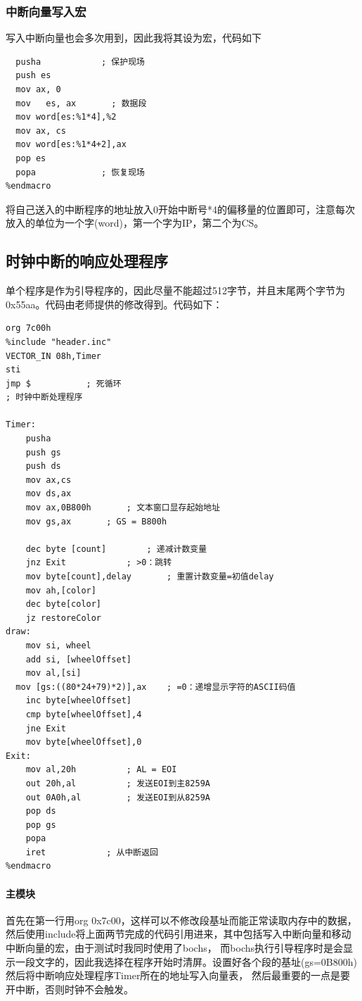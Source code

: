\documentclass[a4paper, 11pt]{article} %
\begin{document}
\subsubsection{中断向量写入宏}
写入中断向量也会多次用到，因此我将其设为宏，代码如下
\begin{lstlisting}[language={[x86masm]Ass
embler},label=VECTOR IN,caption=VECTOR\_IN]
  %macro VECTOR_IN 2
  pusha            ; 保护现场
  push es
  mov ax, 0
  mov	es, ax       ; 数据段
  mov word[es:%1*4],%2
  mov ax, cs
  mov word[es:%1*4+2],ax
  pop es
  popa             ; 恢复现场
%endmacro
\end{lstlisting}
将自己送入的中断程序的地址放入0开始中断号*4的偏移量的位置即可，注意每次放入的单位为一个字(word)，第一个字为IP，第二个为CS。

\subsection{时钟中断的响应处理程序}
单个程序是作为引导程序的，因此尽量不能超过512字节，并且末尾两个字节为0x55aa。代码由老师提供的修改得到。代码如下：
\begin{lstlisting}[language={[x86masm]Assembler},label=TimerTest,caption=Timer(test)]
org 7c00h
%include "header.inc"
VECTOR_IN 08h,Timer
sti
jmp $			; 死循环
; 时钟中断处理程序

Timer:
    pusha
    push gs
    push ds
    mov ax,cs
    mov ds,ax
    mov	ax,0B800h		; 文本窗口显存起始地址
    mov	gs,ax		; GS = B800h

    dec byte [count]		; 递减计数变量
    jnz Exit			; >0：跳转
    mov byte[count],delay		; 重置计数变量=初值delay 
    mov ah,[color]
    dec byte[color]
    jz restoreColor
draw:
    mov si, wheel
    add si, [wheelOffset]
    mov al,[si]
  mov [gs:((80*24+79)*2)],ax	; =0：递增显示字符的ASCII码值
    inc byte[wheelOffset]
    cmp byte[wheelOffset],4
    jne Exit
    mov byte[wheelOffset],0
Exit:
    mov al,20h			; AL = EOI
    out 20h,al			; 发送EOI到主8259A
    out 0A0h,al			; 发送EOI到从8259A
    pop ds
    pop gs
    popa
    iret			; 从中断返回
%endmacro
\end{lstlisting}

\paragraph{主模块}
首先在第一行用org 0x7c00，这样可以不修改段基址而能正常读取内存中的数据，然后使用include将上面两节完成的代码引用进来，其中包括写入中断向量和移动中断向量的宏，由于测试时我同时使用了bochs，
而bochs执行引导程序时是会显示一段文字的，因此我选择在程序开始时清屏。设置好各个段的基址(gs=0B800h)然后将中断响应处理程序Timer所在的地址写入向量表，
然后最重要的一点是要开中断，否则时钟不会触发。
\end{document}
